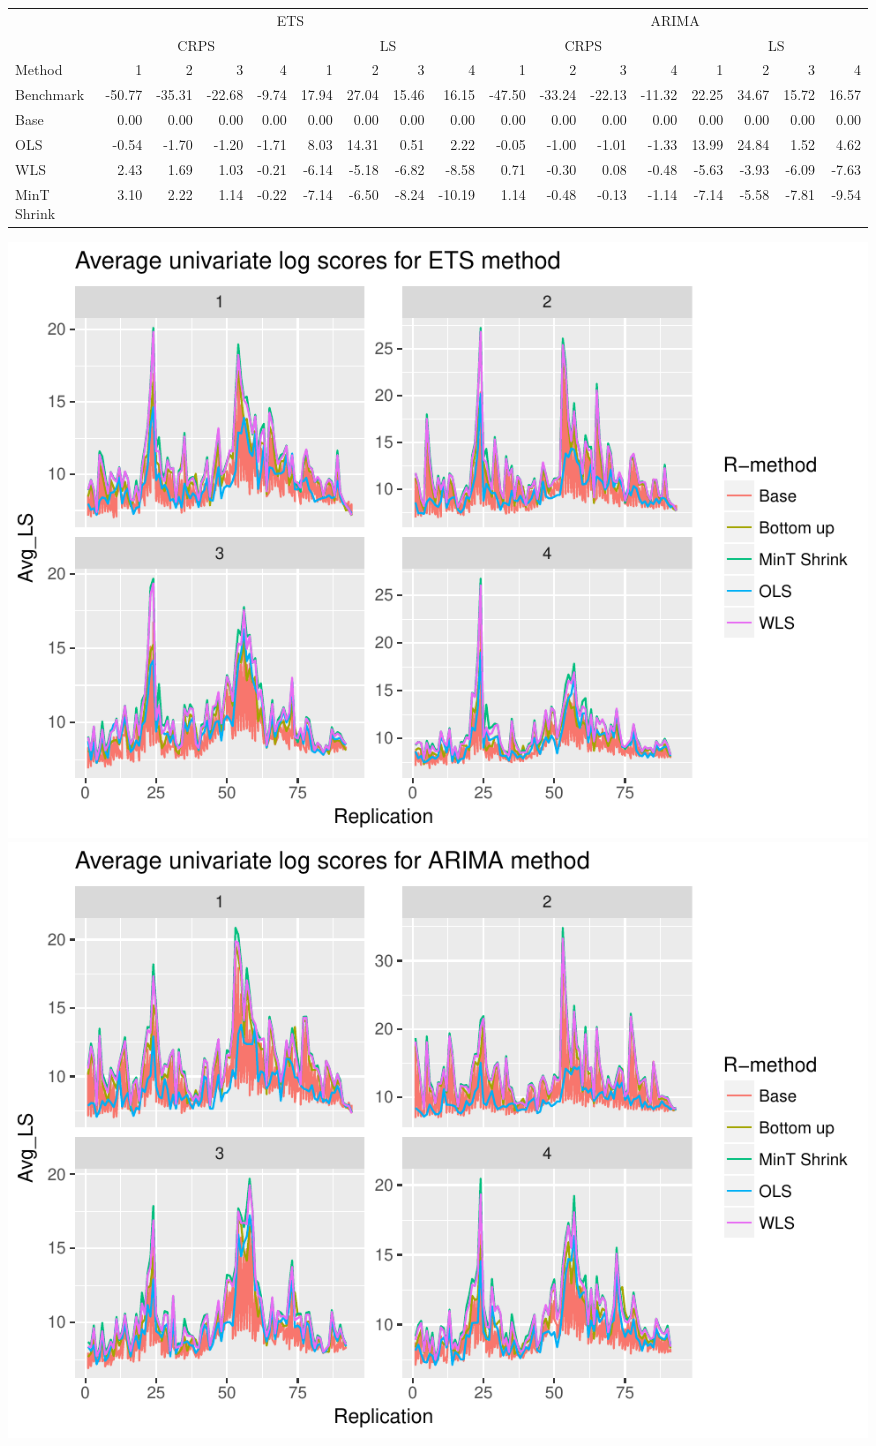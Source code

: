 \documentclass[]{article}
\begin{document}
\begin{table}[H]
\centering
\begin{tabular}{l|r|r|r|r|r|r|r|r|r|r|r|r|r|r|r|r}
\hline
\multicolumn{1}{c|}{ } & \multicolumn{8}{|c|}{ETS} & \multicolumn{8}{|c}{ARIMA} \\
\cline{2-9} \cline{10-17}
\multicolumn{1}{c|}{ } & \multicolumn{4}{|c|}{CRPS} & \multicolumn{4}{|c|}{LS} & \multicolumn{4}{|c|}{CRPS} & \multicolumn{4}{|c}{LS} \\
\cline{2-5} \cline{6-9} \cline{10-13} \cline{14-17}
Method & 1 & 2 & 3 & 4 & 1 & 2 & 3 & 4 & 1 & 2 & 3 & 4 & 1 & 2 & 3 & 4\\
\hline
Benchmark & -50.77 & -35.31 & -22.68 & -9.74 & 17.94 & 27.04 & 15.46 & 16.15 & -47.50 & -33.24 & -22.13 & -11.32 & 22.25 & 34.67 & 15.72 & 16.57\\
\hline
Base & 0.00 & 0.00 & 0.00 & 0.00 & 0.00 & 0.00 & 0.00 & 0.00 & 0.00 & 0.00 & 0.00 & 0.00 & 0.00 & 0.00 & 0.00 & 0.00\\
\hline
OLS & -0.54 & -1.70 & -1.20 & -1.71 & 8.03 & 14.31 & 0.51 & 2.22 & -0.05 & -1.00 & -1.01 & -1.33 & 13.99 & 24.84 & 1.52 & 4.62\\
\hline
WLS & 2.43 & 1.69 & 1.03 & -0.21 & -6.14 & -5.18 & -6.82 & -8.58 & 0.71 & -0.30 & 0.08 & -0.48 & -5.63 & -3.93 & -6.09 & -7.63\\
\hline
MinT Shrink & 3.10 & 2.22 & 1.14 & -0.22 & -7.14 & -6.50 & -8.24 & -10.19 & 1.14 & -0.48 & -0.13 & -1.14 & -7.14 & -5.58 & -7.81 & -9.54\\
\hline
\end{tabular}
\end{table}

\includegraphics{Expenditure-approach-results_files/figure-latex/unnamed-chunk-18-1.pdf}
\includegraphics{Expenditure-approach-results_files/figure-latex/unnamed-chunk-18-2.pdf}
\end{document}
